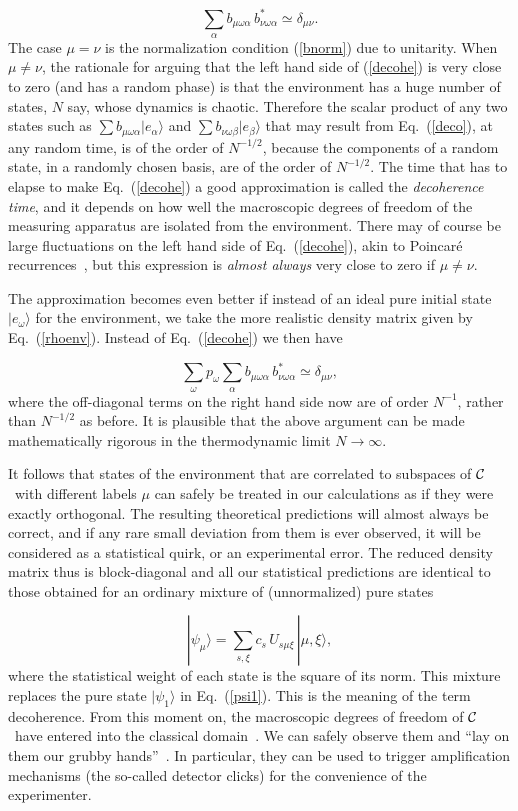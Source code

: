 \documentclass[12pt]{article}
\def\beq{\begin{equation}}
\def\eeq{\end{equation}}
\def\Eq{Eq.~(\ref}
\def\9{\rangle}
\def\cC{$\cal C$}
\begin{document}
\beq \sum_\alpha b_{\mu\omega\alpha}\,b^*_{\nu\omega\alpha}\simeq
  \delta_{\mu\nu}. \label{decohe} \eeq
The case $\mu=\nu$ is the normalization condition (\ref{bnorm}) due to
unitarity. When $\mu\neq\nu$, the rationale for arguing that the left
hand side of (\ref{decohe}) is very close to zero (and has a random
phase) is that the environment has a huge number of states, $N$ say,
whose dynamics is chaotic. Therefore the scalar product of any two
states such as $\sum b_{\mu\omega\alpha}|e_\alpha\9$ and $\sum
b_{\nu\omega\beta}|e_\beta\9$ that may result from \Eq{deco}), at any
random time, is of the order of $N^{-1/2}$, because the components of a
random state, in a randomly chosen basis, are of the order of
$N^{-1/2}$. The time that has to elapse to make Eq.~(\ref{decohe}) a
good approximation is called the {\it decoherence time\/}, and it
depends on how well the macroscopic degrees of freedom of the measuring
apparatus are isolated from the environment. There may of course be
large fluctuations on the left hand side of Eq.~(\ref{decohe}), akin to
Poincar\'e recurrences~\cite{schul}, but this expression is {\it almost
always\/} very close to zero if $\mu\neq\nu$.

The approximation becomes even better if instead of an ideal pure
initial state $|e_\omega\9$ for the environment, we take the more
realistic density matrix given by \Eq{rhoenv}). Instead of
Eq.~(\ref{decohe}) we then have

\beq \sum_\omega p_\omega \sum_\alpha b_{\mu\omega\alpha}\,
  b^*_{\nu\omega\alpha}\simeq \delta_{\mu\nu}, \eeq
where the off-diagonal terms on the right hand side now are of order
$N^{-1}$, rather than $N^{-1/2}$ as before. It is plausible that the
above argument can be made mathematically rigorous in the thermodynamic
limit $N\to\infty$.

It follows that states of the environment that are correlated to
subspaces of \cC\ with different labels $\mu$ can safely be treated in
our calculations as if they were exactly orthogonal. The resulting
theoretical predictions will almost always be correct, and if any rare
small deviation from them is ever observed, it will be considered as a
statistical quirk, or an experimental error. The reduced density matrix
thus is block-diagonal and all our statistical predictions are identical
to those obtained for an ordinary mixture of (unnormalized) pure states

\beq |\psi_\mu\9=\sum_{s,\xi}c_s\,U_{s\mu\xi}\,|\mu,\xi\9,
 \label{psimu} \eeq
where the statistical weight of each state is the square of its norm.
This mixture replaces the pure state $|\psi_1\9$ in \Eq{psi1}). This is
the meaning of the term decoherence. From this moment on, the
macroscopic degrees of freedom of \cC\ have entered into the classical
domain~\cite{Bohr1939,hay}. We can safely observe them and ``lay on them
our grubby hands''~\cite{caves}. In particular, they can be used to
trigger amplification mechanisms (the so-called detector clicks) for the
convenience of the experimenter. 
\end{document}
